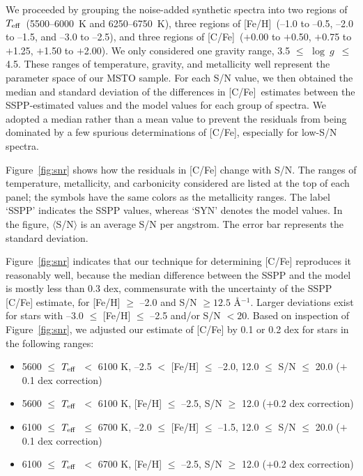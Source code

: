 \documentclass[iop]{emulateapj}
\newcommand*{\teff}{$T_{\rm eff}$}
\newcommand*{\logg}{$\log~g$}
\newcommand*{\feh}{[Fe/H]}
\newcommand*{\cfe}{[C/Fe]}
\begin{document}
We proceeded by grouping the noise-added synthetic spectra into two
regions of \teff\ (5500--6000~K and 6250--6750~K), three regions
of \feh\ (--1.0 to --0.5, --2.0 to --1.5, and --3.0 to --2.5), and three
regions of \cfe\ ($+$0.00 to $+$0.50, $+$0.75 to $+$1.25, $+$1.50 to
$+$2.00). We only considered one gravity range, 3.5 $\leq$ \logg\ $\leq$
4.5. These ranges of temperature, gravity, and metallicity well represent
the parameter space of our MSTO sample. For each S/N value, we then obtained 
the median and standard deviation of the differences in \cfe\ estimates between the
SSPP-estimated values and the model values for each group of spectra.
We adopted a median rather than a mean value to prevent the residuals from being 
dominated by a few spurious determinations of \cfe, especially for 
low-S/N spectra. 

Figure~\ref{fig:snr} shows how the residuals in
[C/Fe] change with S/N. The ranges of temperature, metallicity, and carbonicity 
considered are listed at the top of each panel; the symbols have
the same colors as the metallicity ranges. The label `SSPP' indicates the
SSPP values, whereas `SYN' denotes the model values. In the figure,
$\langle$S/N$\rangle$ is an average S/N per angstrom. The error bar
represents the standard deviation.

Figure~\ref{fig:snr} indicates that our technique for determining [C/Fe]
reproduces it reasonably well, because the median difference between the
SSPP and the model is mostly less than 0.3 dex, commensurate with the
uncertainty of the SSPP [C/Fe] estimate, for [Fe/H] $\ge$ --2.0 and S/N
$\ge 12.5$ \AA$^{-1}$. Larger deviations exist for stars with --3.0
$\leq$ [Fe/H] $\leq$ --2.5 and/or S/N $<20$. Based on inspection of
Figure~\ref{fig:snr}, we adjusted our estimate of [C/Fe] by 0.1 or 0.2
dex for stars in the following ranges:

\begin{itemize}
\item 5600 $\leq$ \teff\ $<$ 6100 K, --2.5 $<$ [Fe/H] $\leq$ --2.0, 12.0 $\leq$ S/N $\leq$ 20.0 ($+$0.1 dex correction)
\item 5600 $\leq$ \teff\ $<$ 6100 K, [Fe/H] $\leq$ --2.5, S/N $\ge$ 12.0 ($+$0.2 dex correction)
\item 6100 $\leq$ \teff\ $\leq$ 6700 K, --2.0 $\leq$ [Fe/H] $\leq$ --1.5, 12.0 $\leq$ S/N $\leq$ 20.0 ($+$0.1 dex correction)
\item 6100 $\leq$ \teff\ $<$ 6700 K, [Fe/H] $\leq$ --2.5, S/N $\ge$ 12.0 ($+$0.2 dex correction)
\end{itemize}
\end{document}
